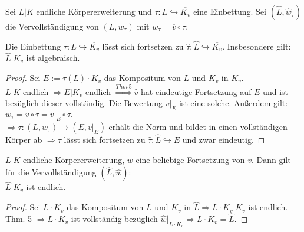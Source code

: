 \begin{Prop}
Sei $L|K$ endliche Körpererweiterung und $\tau: L \hookrightarrow \overline{K_v}$ eine Einbettung. Sei $(\hat{L}, \hat{w}_\tau)$ die Vervollständigung von $(L, w_\tau)$ mit $w_\tau = \overline{v} \circ \tau$.

Die Einbettung $\tau : L \hookrightarrow \overline{K_v}$ lässt sich fortsetzen zu $\hat{\tau}: \hat{L} \hookrightarrow \overline{K_v}$. Insbesondere gilt: $\hat{L}|K_v$ ist algebraisch.
\end{Prop} 

\begin{proof}


Sei $E:= \tau(L) \cdot K_v$ das Kompositum von $L$ und $K_v$ in $\overline{K_v}$.\\
$L|K$ endlich $\Rightarrow E|K_v$ endlich $\stackrel{Thm\ 5}{\Rightarrow} \hat{v}$ hat eindeutige Fortsetzung auf $E$ und ist bezüglich dieser vollständig. Die Bewertung $\overline{v}|_E$ ist eine solche. Außerdem gilt: $w_\tau = \overline{v} \circ \tau = \overline{v}|_E \circ \tau.$\\
$\Rightarrow \tau : (L, w_\tau) \to (E, \overline{v}|_E)$ erhält die Norm und bildet in einen vollständigen Körper ab $\Rightarrow \tau $ lässt sich fortsetzen zu $\hat{\tau}: \hat{L} \hookrightarrow E$ und zwar eindeutig.
\end{proof}

\begin{Prop}
$L|K$ endliche Körpererweiterung, $w$ eine beliebige Fortsetzung von $v$. Dann gilt für die Vervollständigung $(\hat{L}, \hat{w})$:\\
$\hat{L}|K_v$ ist endlich.
\end{Prop}

\begin{proof}
Sei $L \cdot K_v$ das Kompositum von $L$ und $K_v$ in $\hat{L} \Rightarrow L \cdot K_v | K_v$ ist endlich.\\
Thm. 5 $\Rightarrow L \cdot K_v$ ist vollständig bezüglich $\hat{w}|_{L\cdot K_v} \Rightarrow L \cdot K_v = \hat{L}$.
\end{proof}

